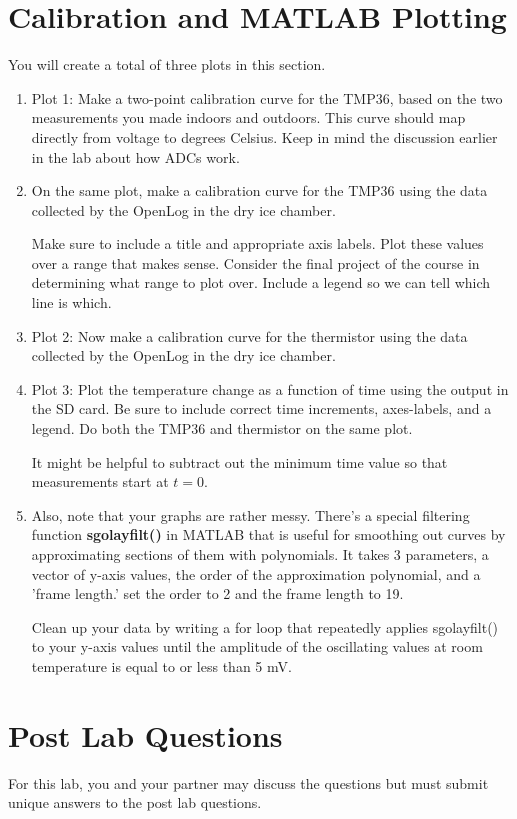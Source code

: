 \documentclass[12pt]{article}
\begin{document}
    
	\section{Calibration and MATLAB Plotting}
	You will create a total of three plots in this section.
	\begin{enumerate}	
	    \item Plot 1: Make a two-point calibration curve for the TMP36, based on the two measurements you made indoors and outdoors. This curve should map directly from voltage to degrees Celsius. Keep in mind the discussion earlier in the lab about how ADCs work.
	    
	    \item On the same plot, make a calibration curve for the TMP36 using the data collected by the OpenLog in the dry ice chamber. 
	    
	    Make sure to include a title and appropriate axis labels. Plot these values over a range that makes sense. Consider the final project of the course in determining what range to plot over. Include a legend so we can tell which line is which.
		
		\item Plot 2: Now make a calibration curve for the thermistor using the data collected by the OpenLog in the dry ice chamber.
	
		\item Plot 3: Plot the temperature change as a function of time using the output in the SD card. Be sure to include correct time increments, axes-labels, and a legend. Do both the TMP36 and thermistor on the same plot. 
		
		It might be helpful to subtract out the minimum time value so that measurements start at $t = 0$.
		
		\item Also, note that your graphs are rather messy. There's a special filtering function \textbf{sgolayfilt()} in MATLAB that is useful for smoothing out curves by approximating sections of them with polynomials. It takes 3 parameters, a vector of y-axis values, the order of the approximation polynomial, and a 'frame length.' set the order to 2 and the frame length to 19. 
		
		Clean up your data by writing a for loop that repeatedly applies sgolayfilt() to your y-axis values until the amplitude of the oscillating values at room temperature is equal to or less than 5 mV.
	\end{enumerate}

	\section*{Post Lab Questions}
	For this lab, you and your partner may discuss the questions but must submit unique answers to the post lab questions. 
	
\end{document}
